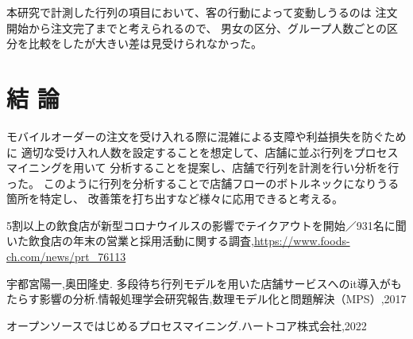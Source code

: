 \documentclass[10pt,twocolumn, a4j]{jsarticle}
\begin{document}
本研究で計測した行列の項目において、客の行動によって変動しうるのは
注文開始から注文完了までと考えられるので、
男女の区分、グループ人数ごとの区分を比較をしたが大きい差は見受けられなかった。


\section{結 論}
モバイルオーダーの注文を受け入れる際に混雑による支障や利益損失を防ぐために
適切な受け入れ人数を設定することを想定して、店舗に並ぶ行列をプロセスマイニングを用いて
分析することを提案し、店舗で行列を計測を行い分析を行った。
このように行列を分析することで店舗フローのボトルネックになりうる箇所を特定し、
改善策を打ち出すなど様々に応用できると考える。



\begin{thebibliography}{1}

  5割以上の飲食店が新型コロナウイルスの影響でテイクアウトを開始／931名に聞いた飲食店の年末の営業と採用活動に関する調査,\url{https://www.foods-ch.com/news/prt_76113}

  宇都宮陽一,奥田隆史. 多段待ち行列モデルを用いた店舗サービスへのit導入がもたらす影響の分析.情報処理学会研究報告,数理モデル化と問題解決（MPS）,2017 

  オープンソースではじめるプロセスマイニング.ハートコア株式会社,2022


\end{thebibliography}






\end{document}
